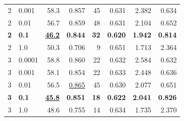 \documentclass[12pt]{jarticle}
\numberwithin{equation}{section}    %
\numberwithin{figure}{section}      %
\numberwithin{table}{section}      %
\begin{document}
\begin{table}[bt]
\begin{center}
{\begin{tabular}{|c|l|rrrrrr|}
                2                        & 0.001                                    & 58.3                         & 0.857                     & 45                         & 0.631                         & 2.382                             & 0.634                    \\
                2                        & 0.01                                     & 56.7                         & 0.859                     & 48                         & 0.631                         & 2.104                             & 0.652                    \\
                \textbf{2}               & \textbf{0.1}                             & \textbf{\underline{46.2}}    & \textbf{0.844}            & \textbf{32}                & \textbf{0.620}                & \textbf{1.942}                    & \textbf{0.814}           \\
                2                        & 1.0                                      & 50.3                         & 0.706                     & 9                          & 0.651                         & 1.713                             & 2.364                    \\
                \hline
                3                        & 0.0001                                   & 58.8                         & 0.860                     & 22                         & 0.632                         & 2.584                             & 0.632                    \\
                3                        & 0.001                                    & 58.1                         & 0.854                     & 22                         & 0.633                         & 2.448                             & 0.636                    \\
                3                        & 0.01                                     & 56.5                         & \underline{0.865}         & 45                         & 0.630                         & 2.077                             & 0.651                    \\
                \textbf{3}               & \textbf{0.1}                             & \textbf{\underline{45.8}}    & \textbf{0.851}            & \textbf{18}                & \textbf{0.622}                & \textbf{2.041}                    & \textbf{0.826}           \\
                3                        & 1.0                                      & 48.6                         & 0.755                     & 14                         & 0.634                         & 1.735                             & 2.370                    \\

\end{tabular}}
\end{center}
\end{table}
\end{document}
